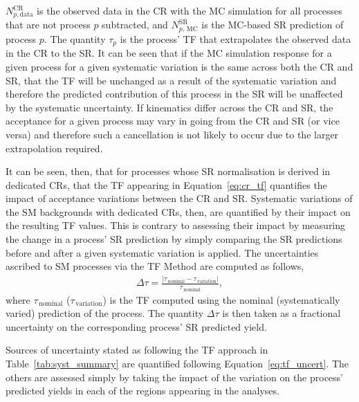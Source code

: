 $N_{p, \text{data}}^{\text{CR}}$ is the observed data in the CR with the MC simulation
for all processes that are not process $p$ subtracted, and $N_{p,\,\text{MC}}^{\text{SR}}$
is the MC-based SR prediction of process $p$.
The quantity $\tau_p$ is the process' TF that extrapolates the observed data in the CR
to the SR.
It can be seen that if the MC simulation response for a given process for a given systematic variation is the same
across both the CR and SR, that the TF will be unchanged as a result of the systematic
variation and therefore the predicted contribution of this process in the SR will
be unaffected by the systematic uncertainty.
If kinematics differ across the CR and SR, the acceptance for a given process may vary
in going from the CR and SR (or vice versa) and therefore such a cancellation is not likely to
occur due to the larger extrapolation required.

It can be seen, then, that for processes whose SR normalisation is derived in dedicated CRs,
that the TF appearing in Equation~\ref{eq:cr_tf} quantifies the impact of acceptance
variations between the CR and SR.
Systematic variations of the SM backgrounds with dedicated CRs, then, are quantified
by their impact on the resulting TF values.
This is contrary to assessing their impact by measuring the change in a process' SR prediction
by simply comparing the SR predictions before and after a given systematic variation is applied.
The uncertainties ascribed to SM processes via the TF Method are computed as follows,
\begin{align}
    \Delta \tau = \frac{ \lvert \tau_{\,\text{nominal}} - \tau_{\,\text{variation}} \rvert} { \tau_{\,\text{nominal}} },
    \label{eq:tf_uncert}
\end{align}
where $\tau_{\,\text{nominal}}$ ($\tau_{\,\text{variation}}$) is the TF computed
using the nominal (systematically varied) prediction of the process.
The quantity $\Delta \tau$ is then taken as a fractional uncertainty on the corresponding
process' SR predicted yield.

Sources of uncertainty stated as following the TF approach in Table~\ref{tab:syst_summary} are
quantified following Equation~\ref{eq:tf_uncert}.
The others are assessed simply by taking the impact of the variation on the process'
predicted yields in each of the regions appearing in the analyses.

%
%

